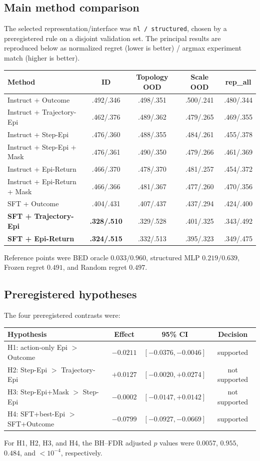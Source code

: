 \documentclass[11pt]{article}
\begin{document}
\subsection{Main method comparison}
The selected representation/interface was \texttt{nl / structured}, chosen by a preregistered rule on a disjoint validation set. The principal results are reproduced below as normalized regret (lower is better) / argmax experiment match (higher is better).

\begin{center}
\small
\begin{tabular}{lcccc}
\toprule
Method & ID & Topology OOD & Scale OOD & rep\_all\\
\midrule
Instruct + Outcome & .492/.346 & .498/.351 & .500/.241 & .480/.344\\
Instruct + Trajectory-Epi & .462/.376 & .489/.362 & .479/.265 & .469/.355\\
Instruct + Step-Epi & .476/.360 & .488/.355 & .484/.261 & .455/.378\\
Instruct + Step-Epi + Mask & .476/.361 & .490/.350 & .479/.266 & .461/.369\\
Instruct + Epi-Return & .466/.370 & .478/.370 & .481/.257 & .454/.372\\
Instruct + Epi-Return + Mask & .466/.366 & .481/.367 & .477/.260 & .470/.356\\
SFT + Outcome & .404/.431 & .407/.437 & .437/.294 & .424/.400\\
\textbf{SFT + Trajectory-Epi} & \textbf{.328/.510} & .329/.528 & .401/.325 & .343/.492\\
\textbf{SFT + Epi-Return} & \textbf{.324/.515} & .332/.513 & .395/.323 & .349/.475\\
\bottomrule
\end{tabular}
\end{center}
Reference points were BED oracle $0.033/0.960$, structured MLP $0.219/0.639$, Frozen regret $0.491$, and Random regret $0.497$.

\subsection{Preregistered hypotheses}
The four preregistered contrasts were:
\begin{center}
\small
\begin{tabular}{lccc}
\toprule
Hypothesis & Effect & 95\% CI & Decision\\
\midrule
H1: action-only Epi $>$ Outcome & $-0.0211$ & $[-0.0376,-0.0046]$ & supported\\
H2: Step-Epi $>$ Trajectory-Epi & $+0.0127$ & $[-0.0020,+0.0274]$ & not supported\\
H3: Step-Epi+Mask $>$ Step-Epi & $-0.0002$ & $[-0.0147,+0.0142]$ & not supported\\
H4: SFT+best-Epi $>$ SFT+Outcome & $-0.0799$ & $[-0.0927,-0.0669]$ & supported\\
\bottomrule
\end{tabular}
\end{center}
For H1, H2, H3, and H4, the BH--FDR adjusted $p$ values were $0.0057$, $0.955$, $0.484$, and $<10^{-4}$, respectively.
\end{document}
